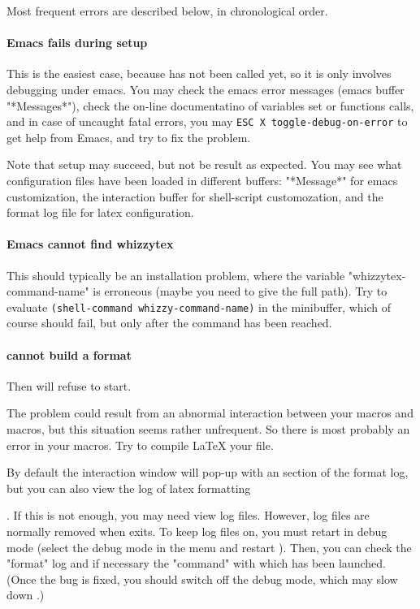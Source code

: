 \documentclass[12pt]{article}
\begin{document}
Most frequent errors are described below, in chronological order.


\paragraph {Emacs fails during setup}

This is the easiest case, because {\whizzy} has not been called yet, so it
is only involves debugging under emacs. 
You may check the emacs error messages (emacs buffer \lst"*Messages*"),
check the on-line documentatino of variables set or functions calls, and
in case of uncaught fatal errors, you may
\verb"ESC X toggle-debug-on-error" to get help from Emacs, and try to fix
the problem. 

Note that setup may succeed, but not be result as expected. 
You may see what configuration files have been loaded in different buffers: 
\lst"*Message*" for emacs customization, the interaction buffer 
for shell-script customozation, and the format log file for latex
configuration.


\paragraph {Emacs cannot find whizzytex}

This should typically be an installation problem, where the variable
\lst"whizzytex-command-name" is erroneous (maybe you need to give the full
path). Try to evaluate \verb"(shell-command whizzy-command-name)" in the
minibuffer, which of course should fail, but only after the command has been
reached.

\paragraph {{\whizzy} cannot build a format}

Then {\whizzy} will refuse to start. 

The problem could result from an abnormal interaction between your macros
and {\whizzy} macros, but this situation seems rather unfrequent.  So there
is most probably an error in your macros.  Try to compile {\LaTeX} your
file.  

By default the interaction window will pop-up with an section of the format
log, but you can also view the log of latex formatting 

. If this is not enough, you may need view log files.  However, log
files are normally removed when {\whizzy} exits.  To keep log files on,
you must retart {\whizzy} in debug mode (select the debug mode in the
menu and restart {\whizzy}). Then, you can check the \lst"format" log and
if necessary the \lst"command" with which {\whizzy} has been launched.
(Once the bug is fixed, you should switch off the debug mode, which may slow
down {\whizzy}.)
\end{document}

